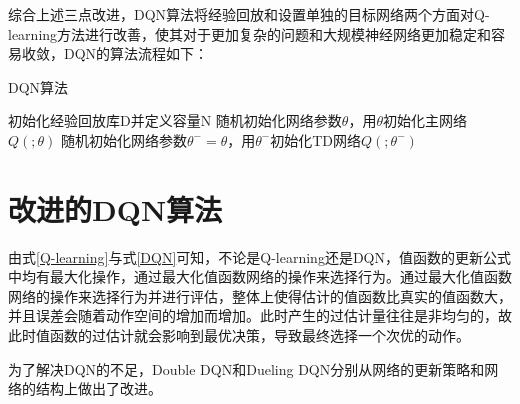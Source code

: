 综合上述三点改进，DQN算法将经验回放和设置单独的目标网络两个方面对Q-learning方法进行改善，使其对于更加复杂的问题和大规模神经网络更加稳定和容易收敛，DQN的算法流程如下：

\begin{algorithm}[H]  
	\caption{DQN算法}%
	初始化经验回放库D并定义容量N\;
    随机初始化网络参数$\theta$，用$\theta$初始化主网络$Q(; \theta)$\;
    随机初始化网络参数$\theta^{-}=\theta$，用$\theta^{-}$初始化TD网络$Q(; \theta^{-})$\;
\end{algorithm}

\section{改进的DQN算法}\label{2.4改进的DQN算法} %

由式\ref{Q-learning}与式\ref{DQN}可知，不论是Q-learning还是DQN，值函数的更新公式中均有最大化操作，通过最大化值函数网络的操作来选择行为。通过最大化值函数网络的操作来选择行为并进行评估，整体上使得估计的值函数比真实的值函数大，并且误差会随着动作空间的增加而增加。此时产生的过估计量往往是非均匀的，故此时值函数的过估计就会影响到最优决策，导致最终选择一个次优的动作。

为了解决DQN的不足，Double DQN和Dueling DQN分别从网络的更新策略和网络的结构上做出了改进。

